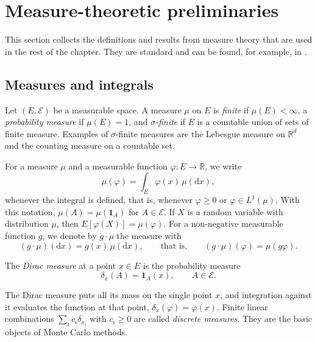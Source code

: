 \section{Measure-theoretic preliminaries}
\label{sec:smc_preliminaries}
This section collects the definitions and results from measure theory that are used in the rest of the chapter. They are standard and can be found, for example, in \cite{chopin2020smc}.

\subsection{Measures and integrals}
Let $(E,\mathcal{E})$ be a measurable space. A measure $\mu$ on $E$ is \emph{finite} if $\mu(E)<\infty$, a \emph{probability measure} if $\mu(E)=1$, and \emph{$\sigma$-finite} if $E$ is a countable union of sets of finite measure. Examples of $\sigma$-finite measures are the Lebesgue measure on $\mathbb{R}^d$ and the counting measure on a countable set.

For a measure $\mu$ and a measurable function $\varphi\colon E\to\mathbb{R}$, we write
\begin{equation}
    \mu(\varphi) = \int_E \varphi(x)\,\mu(\mathrm{d}x),
\end{equation}
whenever the integral is defined, that is, whenever $\varphi\ge0$ or $\varphi\in L^1(\mu)$. With this notation, $\mu(A) = \mu(\mathbf{1}_A)$ for $A\in\mathcal{E}$. If $X$ is a random variable with distribution $\mu$, then $E[\varphi(X)] = \mu(\varphi)$.
For a non-negative measurable function $g$, we denote by $g\cdot\mu$ the measure with
\begin{equation}
    (g\cdot\mu)(\mathrm{d}x) = g(x)\,\mu(\mathrm{d}x), \qquad\text{that is,}\qquad (g\cdot\mu)(\varphi) = \mu(g\varphi).
\end{equation}

\begin{definition}
    \label{def:dirac_measure}
    The \emph{Dirac measure} at a point $x\in E$ is the probability measure
    \begin{equation}
        \delta_x(A) = \mathbf{1}_A(x), \qquad A\in\mathcal{E}.
    \end{equation}
\end{definition}
The Dirac measure puts all its mass on the single point $x$, and integration against it evaluates the function at that point, $\delta_x(\varphi) = \varphi(x)$. Finite linear combinations $\sum_{i}c_i\delta_{x_i}$ with $c_i\ge0$ are called \emph{discrete measures}. They are the basic objects of Monte Carlo methods.

